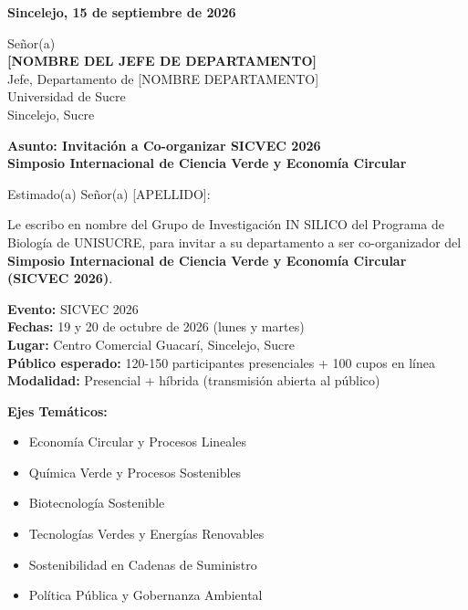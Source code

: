 \documentclass[12pt,a4paper]{article}
\begin{document}
\vspace{1cm}

\noindent
\textbf{Sincelejo, 15 de septiembre de 2026}

\vspace{1.5cm}

\noindent
Señor(a)\\
\textbf{[NOMBRE DEL JEFE DE DEPARTAMENTO]}\\
Jefe, Departamento de [NOMBRE DEPARTAMENTO]\\
Universidad de Sucre\\
Sincelejo, Sucre

\vspace{1.5cm}

\noindent
\textbf{\large Asunto: Invitación a Co-organizar SICVEC 2026}\\
\textbf{\large Simposio Internacional de Ciencia Verde y Economía Circular}

\vspace{1.5cm}

Estimado(a) Señor(a) [APELLIDO]:

\vspace{0.8cm}

Le escribo en nombre del Grupo de Investigación IN SILICO del Programa de Biología de UNISUCRE, para invitar a su departamento a ser co-organizador del \textbf{Simposio Internacional de Ciencia Verde y Economía Circular (SICVEC 2026)}.

\vspace{0.8cm}

\textbf{Evento:} SICVEC 2026\\
\textbf{Fechas:} 19 y 20 de octubre de 2026 (lunes y martes)\\
\textbf{Lugar:} Centro Comercial Guacarí, Sincelejo, Sucre\\
\textbf{Público esperado:} 120-150 participantes presenciales + 100 cupos en línea\\
\textbf{Modalidad:} Presencial + híbrida (transmisión abierta al público)

\vspace{1cm}

\textbf{Ejes Temáticos:}
\begin{itemize}
  \item Economía Circular y Procesos Lineales
  \item Química Verde y Procesos Sostenibles
  \item Biotecnología Sostenible
  \item Tecnologías Verdes y Energías Renovables
  \item Sostenibilidad en Cadenas de Suministro
  \item Política Pública y Gobernanza Ambiental
\end{itemize}
\end{document}
